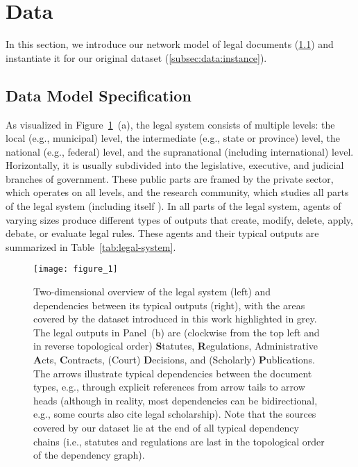 \section{Data}
\label{sec:data}

In this section, we introduce our network model of legal documents (\ref{subsec:data:model}) and instantiate it for our original dataset (\ref{subsec:data:instance}).

\vspace*{6pt}
\subsection{Data Model Specification}\label{subsec:data:model}

As visualized in Figure~\ref{fig:legal-system}~(a), the legal system consists of multiple levels: 
the local (e.g., municipal) level, the intermediate (e.g., state or province) level, the national (e.g., federal) level, and the supranational (including international) level.
Horizontally, it is usually subdivided into the legislative, executive, and judicial branches of government. 
These public parts are framed by the private sector, which operates on all levels, and the research community, which studies all parts of the legal system (including itself \cite{katz2011,newton2011,schwartz2011,george2006,ellickson2000}).
In all parts of the legal system, agents of varying sizes produce different types of outputs that create, modify, delete, apply, debate, or evaluate legal rules.
These agents and their typical outputs are summarized in Table~\ref{tab:legal-system}.

\begin{figure}
    \centering
    \texttt{[image: figure\_1]}
    \caption{Two-dimensional overview of the legal system (left) and dependencies between its typical outputs (right), with the areas covered by the dataset introduced in this work highlighted in grey. 
    The legal outputs in Panel~(b) are (clockwise from the top left and in reverse topological order) \textbf{S}tatutes, \textbf{R}egulations, Administrative \textbf{A}cts, \textbf{C}ontracts, (Court) \textbf{D}ecisions, and (Scholarly) \textbf{P}ublications.
    The arrows illustrate typical dependencies between the document types, e.g., through explicit references from arrow tails to arrow heads (although in reality, most dependencies can be bidirectional, e.g., some courts also cite legal scholarship). 
    Note that the sources covered by our dataset lie at the end of all typical dependency chains (i.e., statutes and regulations are last in the topological order of the dependency graph).
    }\label{fig:legal-system}
\end{figure}

